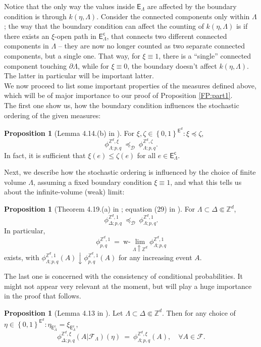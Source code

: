 \documentclass[12pt]{article}
\newcommand{\D}{\mathcal{D}}
\newcommand{\E}{\mathsf{E}}
\newcommand{\F}{\mathcal{F}}
\newcommand{\Z}{\mathbb{Z}}
\newcommand{\set}[1]{\left\{#1\right\}}
\newcommand{\1}{\mathbbm{1}}
\renewcommand{\c}{\mathsf{c}}
\newcommand{\5}{\vspace{0.5cm}}
\theoremstyle{definition}
\newtheorem{prop}[thm]{Proposition}
\begin{document}
Notice that the only way the values inside $\E_\Lambda$ are affected by the boundary condition is through $k(\eta,\Lambda)$. Consider the connected components only within $\Lambda$; the way that the boundary condition can affect the counting of $k(\eta,\Lambda)$ is if there exists an $\xi$-open path in $\E_\Lambda^\c$, that connects two different connected components in $\Lambda$ -- they are now no longer counted as two separate connected components, but a single one. That way, for $\xi\equiv 1$, there is a ``single'' connected component touching $\partial\Lambda$, while for $\xi\equiv 0$, the boundary doesn't affect $k(\eta,\Lambda)$. The latter in particular will be important latter. \\

We now proceed to list some important properties of the measures defined above, which will be of major importance to our proof of Proposition \ref{FP:part1}.  \\

The first one show us, how the boundary condition influences the stochastic ordering of the given measures:
\begin{prop}[Lemma 4.14.(b) in \cite{Gri}]
For $\xi,\zeta\in\set{0,1}^{\E^d}:\xi\preceq\zeta$,
$$\phi_{\Lambda;p,q}^{\Z^d,\xi} ~\preceq_\D~ \phi_{\Lambda;p,q}^{\Z^d,\zeta}.$$
In fact, it is sufficient that $\xi(e)\leq\zeta(e)$ for all $e\in\E_\Lambda^\c$.
\end{prop}

Next, we describe how the stochastic ordering is influenced by the choice of finite volume $\Lambda$, assuming a fixed boundary condition $\xi\equiv 1$, and what this tells us about the infinite-volume (weak) limit:
\begin{prop}[Theorem 4.19.(a) in \cite{Gri}; equation (29) in \cite{GHM}]
For $\Lambda\subset\Delta\Subset\Z^d$,
$$\phi_{\Delta;p,q}^{\Z^d,1} ~\preceq_\D~ \phi_{\Lambda;p,q}^{\Z^d,1}.$$
In particular,
$$\phi_{p,q}^{\Z^d,1} ~=~ \text{w-}\!\!\lim_{\Lambda\Uparrow\Z^d}\phi_{\Lambda;p,q}^{\Z^d,1}$$
exists, with $\phi_{\Lambda;p,q}^{\Z^d,1}(A)\downarrow\phi_{p,q}^{\Z^d,1}(A)$ for any increasing event $A$.
\end{prop}
The last one is concerned with the consistency of conditional probabilities. It might not appear very relevant at the moment, but will play a huge importance in the proof that follows.
\begin{prop}[Lemma 4.13 in \cite{Gri}]
Let $\Lambda\subset\Delta\Subset\Z^d$. Then for any choice of $\eta\in\set{0,1}^{\E^d}:\eta_{\E_\Lambda^\c}=\xi_{\E_\Lambda^\c}$,
$$\phi_{\Delta;p,q}^{\Z^d,\xi}(A|\F_\Lambda)(\eta) ~=~ \phi_{\Lambda;p,q}^{\Z^d,\xi}(A), \quad \forall A\in\F.$$
\end{prop}
\end{document}
